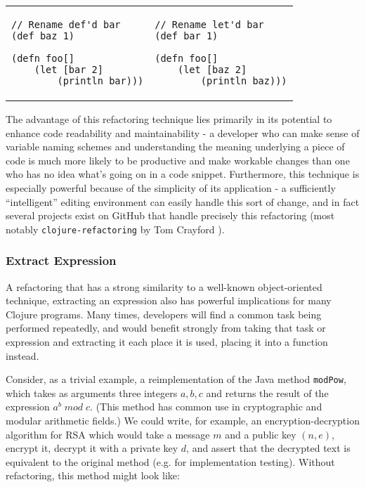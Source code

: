 \documentclass{article}
\begin{document}
\begin{tabular}{m{2in} m{2in}} \\
\begin{verbatim}
// Rename def'd bar
(def baz 1)

(defn foo[]
    (let [bar 2]
        (println bar)))
\end{verbatim}
&
\begin{verbatim}
// Rename let'd bar
(def bar 1)

(defn foo[]
    (let [baz 2]
        (println baz)))
\end{verbatim}
\end{tabular}

The advantage of this refactoring technique lies primarily in its potential to enhance code readability and maintainability - a developer who can make sense of variable naming schemes and understanding the meaning underlying a piece of code is much more likely to be productive and make workable changes than one who has no idea what's going on in a code snippet. Furthermore, this technique is especially powerful because of the simplicity of its application - a sufficiently ``intelligent'' editing environment can easily handle this sort of change, and in fact several projects exist on GitHub that handle precisely this refactoring (most notably \verb!clojure-refactoring! by Tom Crayford \cite{3}).

\subsubsection{Extract Expression}

A refactoring that has a strong similarity to a well-known object-oriented technique, extracting an expression also has powerful implications for many Clojure programs. Many times, developers will find a common task being performed repeatedly, and would benefit strongly from taking that task or expression and extracting it each place it is used, placing it into a function instead.

Consider, as a trivial example, a reimplementation of the Java method \verb!modPow!, which takes as arguments three integers $a, b, c$ and returns the result of the expression $a^{b} \; mod \; c$. (This method has common use in cryptographic and modular arithmetic fields.) We could write, for example, an encryption-decryption algorithm for RSA which would take a message $m$ and a public key $(n, e)$, encrypt it, decrypt it with a private key $d$, and assert that the decrypted text is equivalent to the original method (e.g. for implementation testing). Without refactoring, this method might look like:
\end{document}
